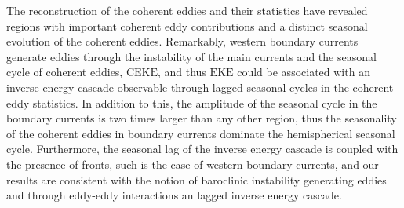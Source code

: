 \documentclass[draft,linenumbers]{agujournal2019}
\newcommand{\EKE}{\textrm{EKE}}
\newcommand{\CEKE}{\textrm{CEKE}}
\begin{document}
	The reconstruction of the coherent eddies and their statistics have revealed regions with important coherent eddy contributions and a distinct seasonal evolution of the coherent eddies. 
	Remarkably, western boundary currents generate eddies through the instability of the main currents and the seasonal cycle of coherent eddies, $\CEKE$, and thus $\EKE$ could be associated with an inverse energy cascade observable through lagged seasonal cycles in the coherent eddy statistics. 
	In addition to this, the amplitude of the seasonal cycle in the boundary currents is two times larger than any other region, thus the seasonality of the coherent eddies in boundary currents dominate the hemispherical seasonal cycle. 
	Furthermore, the seasonal lag of the inverse energy cascade is coupled with the presence of fronts, such is the case of western boundary currents, and our results are consistent with the notion of baroclinic instability generating eddies and through eddy-eddy interactions an lagged inverse energy cascade.


	
	








\end{document}
